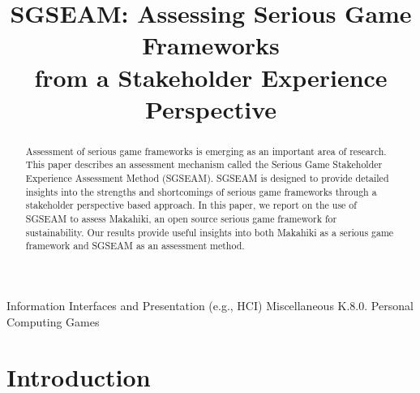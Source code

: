 \documentclass{sigchi}
\begin{document}
\title{SGSEAM: Assessing Serious Game Frameworks\\ from a Stakeholder Experience Perspective}


\maketitle

\begin{abstract}
Assessment of serious game frameworks is emerging as an important area of research. 
This paper describes an assessment mechanism called the Serious Game Stakeholder Experience
Assessment Method (SGSEAM). SGSEAM is designed to provide detailed insights into the strengths
and shortcomings of serious game frameworks through a stakeholder perspective based approach.
In this paper, we report on the use of SGSEAM to assess Makahiki, an open source serious game
framework for sustainability. Our results provide useful insights into both Makahiki as a serious game framework and SGSEAM as an assessment method.
\end{abstract}


 {Information Interfaces and Presentation (e.g., HCI)} {Miscellaneous K.8.0.  Personal Computing Games}




\section{Introduction}
\end{document}
